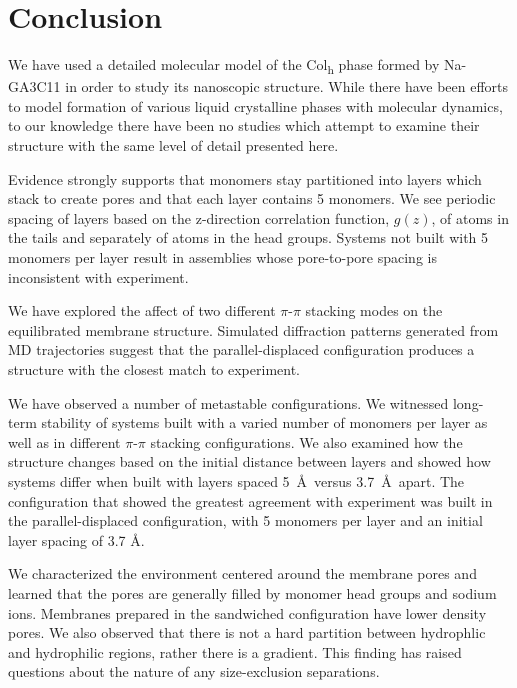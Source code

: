 \documentclass[journal=jpcbfk,manusciprt=article]{achemso}
\begin{document}
  \section{Conclusion}
  
  We have used a detailed molecular model of the Col\textsubscript{h} phase
  formed by Na-GA3C11 in order to study its nanoscopic structure. While there
  have been efforts to model formation of various liquid crystalline phases with
  molecular dynamics, to our knowledge there have been no studies which attempt
  to examine their structure with the same level of detail presented here.

  Evidence strongly supports that monomers stay partitioned into layers which
  stack to create pores and that each layer contains 5 monomers. We see periodic
  spacing of layers based on the z-direction correlation function, $g(z)$, of
  atoms in the tails and separately of atoms in the head groups. Systems not
  built with 5 monomers per layer result in assemblies whose pore-to-pore spacing
  is inconsistent with experiment. 

  We have explored the affect of two different $\pi$-$\pi$ stacking modes on
  the equilibrated membrane structure. Simulated diffraction patterns generated
  from MD trajectories suggest that the parallel-displaced configuration produces
  a structure with the closest match to experiment.

  We have observed a number of metastable configurations. We witnessed
  long-term stability of systems built with a varied number of monomers per layer
  as well as in different $\pi$-$\pi$ stacking configurations. We also examined
  how the structure changes based on the initial distance between layers and
  showed how systems differ when built with layers spaced 5~\AA~versus
  3.7~\AA~apart. The configuration that showed the greatest agreement with
  experiment was built in the parallel-displaced configuration, with 5 monomers
  per layer and an initial layer spacing of 3.7 \AA.  

  We characterized the environment centered around the membrane pores and
  learned that the pores are generally filled by monomer head groups and sodium
  ions. Membranes prepared in the sandwiched configuration have lower density 
  pores. We also observed that there is not a hard partition between hydrophlic
  and hydrophilic regions, rather there is a gradient.  This finding has raised
  questions about the nature of any size-exclusion separations.  
\end{document}
